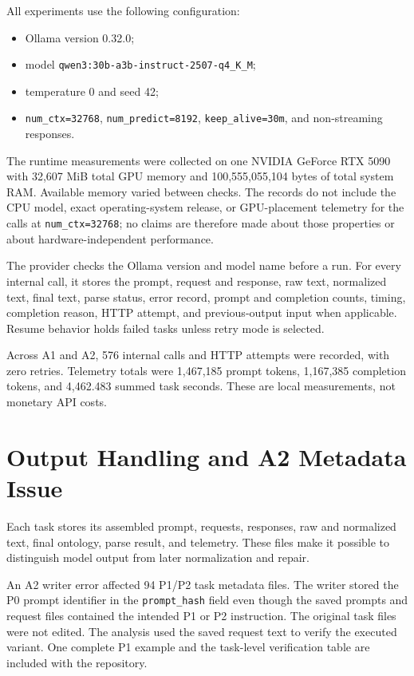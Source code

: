 \documentclass[11pt,a4paper]{article}
\newcommand{\code}[1]{\texttt{#1}}
\begin{document}
All experiments use the following configuration:

\begin{itemize}
  \item Ollama version 0.32.0;
  \item model \code{qwen3:30b-a3b-instruct-2507-q4\_K\_M};
  \item temperature 0 and seed 42;
  \item \code{num\_ctx=32768}, \code{num\_predict=8192},
        \code{keep\_alive=30m}, and non-streaming responses.
\end{itemize}

The runtime measurements were collected on one NVIDIA GeForce RTX 5090 with
32,607 MiB total GPU memory and 100,555,055,104 bytes of total system RAM.
Available memory varied between checks. The records do not include the CPU
model, exact operating-system release, or GPU-placement telemetry for the
calls at \code{num\_ctx=32768}; no claims are therefore made about
those properties or about hardware-independent performance.

The provider checks the Ollama version and model name before a run. For every
internal call, it stores the prompt, request and response, raw text, normalized text, final text,
parse status, error record, prompt and completion counts, timing, completion
reason, HTTP attempt, and previous-output input when applicable. Resume behavior
holds failed tasks unless retry mode is selected.

Across A1 and A2, 576 internal calls and HTTP attempts were
recorded, with zero retries. Telemetry totals were 1,467,185 prompt tokens,
1,167,385 completion tokens, and 4,462.483 summed task seconds. These are local
measurements, not monetary API costs.

\section{Output Handling and A2 Metadata Issue}

Each task stores its assembled prompt, requests, responses, raw and normalized
text, final ontology, parse result, and telemetry. These files make it possible
to distinguish model output from later normalization and repair.

An A2 writer error affected 94 P1/P2 task metadata files. The writer stored the
P0 prompt identifier in the \code{prompt\_hash} field even though the saved
prompts and request files contained the intended P1 or P2 instruction. The
original task files were not edited. The analysis used the saved request text to
verify the executed variant. One complete P1 example and the task-level
verification table are included with the repository.
\end{document}
